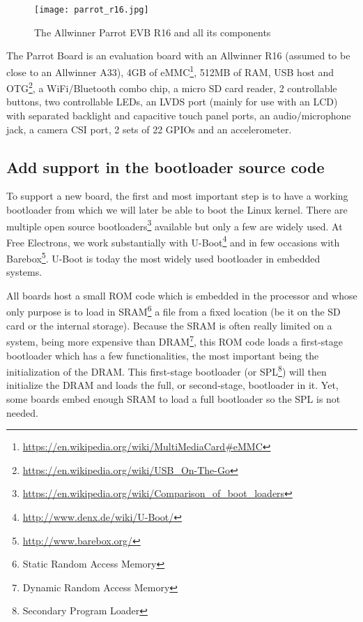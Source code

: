 \begin{figure}[H]
  \texttt{[image: parrot\_r16.jpg]}
  \caption{The Allwinner Parrot EVB R16 and all its components}
\end{figure}

The Parrot Board is an evaluation board with an Allwinner R16 (assumed to be close to an Allwinner A33), 4GB of eMMC\footnote{\url{https://en.wikipedia.org/wiki/MultiMediaCard\#eMMC}}, 512MB of RAM, USB host and OTG\footnote{\url{https://en.wikipedia.org/wiki/USB\_On-The-Go}}, a WiFi/Bluetooth combo chip, a micro SD card reader, 2 controllable buttons, two controllable LEDs, an LVDS port (mainly for use with an LCD) with separated backlight and capacitive touch panel ports, an audio/microphone jack, a camera CSI port, 2 sets of 22 GPIOs and an accelerometer.

\subsection{Add support in the bootloader source code}
To support a new board, the first and most important step is to have a working bootloader from which we will later be able to boot the Linux kernel. There are multiple open source bootloaders\footnote{\url{https://en.wikipedia.org/wiki/Comparison\_of\_boot\_loaders}} available but only a few are widely used. At Free Electrons, we work substantially with U-Boot\footnote{\url{http://www.denx.de/wiki/U-Boot/}} and in few occasions with Barebox\footnote{\url{http://www.barebox.org/}}. U-Boot is today the most widely used bootloader in embedded systems.

All boards host a small ROM code which is embedded in the processor and whose only purpose is to load in SRAM\footnote{Static Random Access Memory} a file from a fixed location (be it on the SD card or the internal storage). Because the SRAM is often really limited on a system, being more expensive than DRAM\footnote{Dynamic Random Access Memory}, this ROM code loads a first-stage bootloader which has a few functionalities, the most important being the initialization of the DRAM. This first-stage bootloader (or SPL\footnote{Secondary Program Loader}) will then initialize the DRAM and loads the full, or second-stage, bootloader in it. Yet, some boards embed enough SRAM to load a full bootloader so the SPL is not needed.

